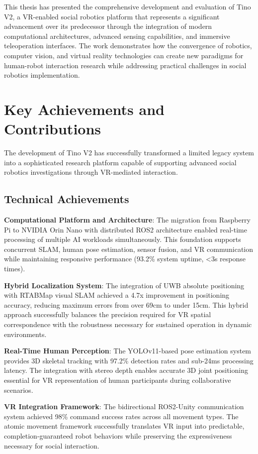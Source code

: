 This thesis has presented the comprehensive development and evaluation of Tino V2, a VR-enabled social robotics platform that represents a significant advancement over its predecessor through the integration of modern computational architectures, advanced sensing capabilities, and immersive teleoperation interfaces. The work demonstrates how the convergence of robotics, computer vision, and virtual reality technologies can create new paradigms for human-robot interaction research while addressing practical challenges in social robotics implementation.

\section{Key Achievements and Contributions}

The development of Tino V2 has successfully transformed a limited legacy system into a sophisticated research platform capable of supporting advanced social robotics investigations through VR-mediated interaction.

\subsection{Technical Achievements}

\textbf{Computational Platform and Architecture}: The migration from Raspberry Pi to NVIDIA Orin Nano with distributed ROS2 architecture enabled real-time processing of multiple AI workloads simultaneously. This foundation supports concurrent SLAM, human pose estimation, sensor fusion, and VR communication while maintaining responsive performance (93.2\% system uptime, <3s response times).

\textbf{Hybrid Localization System}: The integration of UWB absolute positioning with RTABMap visual SLAM achieved a 4.7x improvement in positioning accuracy, reducing maximum errors from over 69cm to under 15cm. This hybrid approach successfully balances the precision required for VR spatial correspondence with the robustness necessary for sustained operation in dynamic environments.

\textbf{Real-Time Human Perception}: The YOLOv11-based pose estimation system provides 3D skeletal tracking with 97.2\% detection rates and sub-24ms processing latency. The integration with stereo depth enables accurate 3D joint positioning essential for VR representation of human participants during collaborative scenarios.

\textbf{VR Integration Framework}: The bidirectional ROS2-Unity communication system achieved 98\% command success rates across all movement types. The atomic movement framework successfully translates VR input into predictable, completion-guaranteed robot behaviors while preserving the expressiveness necessary for social interaction.

